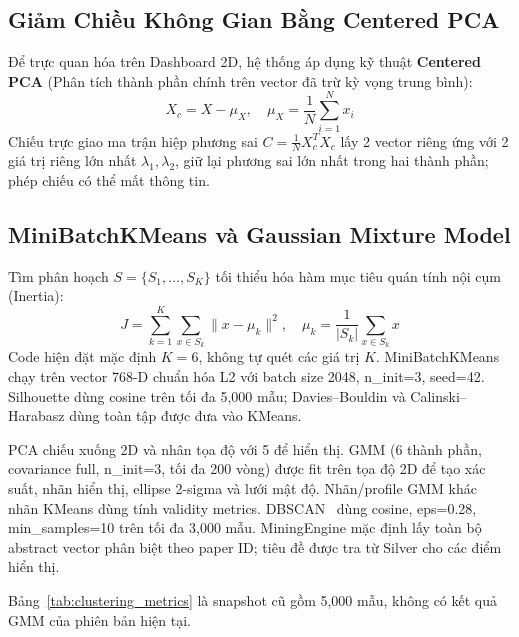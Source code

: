 \subsection{Giảm Chiều Không Gian Bằng Centered PCA}
Để trực quan hóa trên Dashboard 2D, hệ thống áp dụng kỹ thuật \textbf{Centered PCA} (Phân tích thành phần chính trên vector đã trừ kỳ vọng trung bình):
\begin{equation}
  X_c = X - \mu_X, \quad \mu_X = \frac{1}{N}\sum_{i=1}^N x_i
\end{equation}
Chiếu trực giao ma trận hiệp phương sai $C = \frac{1}{N} X_c^T X_c$ lấy 2 vector riêng ứng với 2 giá trị riêng lớn nhất $\lambda_1, \lambda_2$, giữ lại phương sai lớn nhất trong hai thành phần; phép chiếu có thể mất thông tin.

\subsection{MiniBatchKMeans và Gaussian Mixture Model}
Tìm phân hoạch $S = \{S_1, \dots, S_K\}$ tối thiểu hóa hàm mục tiêu quán tính nội cụm (Inertia):
\begin{equation}
  J = \sum_{k=1}^K \sum_{x \in S_k} \|x - \mu_k\|^2, \quad \mu_k = \frac{1}{|S_k|}\sum_{x \in S_k} x
\end{equation}
Code hiện đặt mặc định $K=6$, không tự quét các giá trị $K$. MiniBatchKMeans chạy trên vector 768-D chuẩn hóa L2 với batch size 2048, n\_init=3, seed=42. Silhouette dùng cosine trên tối đa 5,000 mẫu; Davies--Bouldin và Calinski--Harabasz dùng toàn tập được đưa vào KMeans.

PCA chiếu xuống 2D và nhân tọa độ với 5 để hiển thị. GMM (6 thành phần, covariance full, n\_init=3, tối đa 200 vòng) được fit trên tọa độ 2D để tạo xác suất, nhãn hiển thị, ellipse 2-sigma và lưới mật độ. Nhãn/profile GMM khác nhãn KMeans dùng tính validity metrics. DBSCAN~\cite{ester1996density} dùng cosine, eps=0.28, min\_samples=10 trên tối đa 3,000 mẫu. MiningEngine mặc định lấy toàn bộ abstract vector phân biệt theo paper ID; tiêu đề được tra từ Silver cho các điểm hiển thị.

Bảng~\ref{tab:clustering_metrics} là snapshot cũ gồm 5,000 mẫu, không có kết quả GMM của phiên bản hiện tại.



